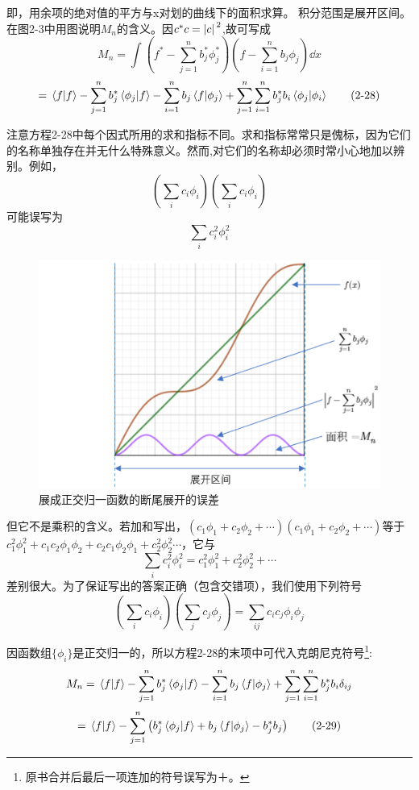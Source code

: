 即，用余项的绝对值的平方与x对划的曲线下的面积求算。
积分范围是展开区间。在图2-3中用图说明$M_n$的含义。因$c^*c=\abs*{c}^2$,故可写成
\[M_n=\int \left ( f^*-\sum_{j=1}^nb_j^*\phi_j^* \right ) \left ( f-\sum_{i=1}^nb_j\phi_j \right )\dd{x}\]
\[=\bra*{f}\ket*{f}-\sum_{j=1}^nb^*_j\bra*{\phi_j}\ket*{f}-\sum_{i=1}^nb_j\bra*{f}\ket*{\phi_j}+\sum_{j=1}^n\sum_{i=1}^nb_j^*b_i\bra*{\phi_j}\ket*{\phi_i} \tag{2-28}\]

注意方程2-28中每个因式所用的求和指标不同。求和指标常常只是傀标，因为它们的名称单独存在并无什么特殊意义。然而,对它们的名称却必须时常小心地加以辨别。例如，
\[\left (\sum_ic_i\phi_i\right )\left (\sum_ic_i\phi_i\right )\]
可能误写为
\[\sum_ic_i^2\phi_i^2\]
\begin{figure}[htbp]
    \centering
    \includegraphics[scale=0.6]{./fig/2-3.png}
    \caption{展成正交归一函数的断尾展开的误差}
\end{figure}
但它不是乘积的含义。若加和写出，$(c_1\phi_1+c_2\phi_2+ \cdots )(c_1\phi_1+c_2\phi_2+ \cdots )$等于$c_1^2\phi_1^2+c_1c_2\phi_1\phi_2+c_2c_1\phi_2\phi_1+c_2^2\phi_2^2 \cdots $，它与
\[\sum_ic_i^2\phi_i^2=c_1^2\phi_1^2+c_2^2\phi_2^2+ \cdots\]
差别很大。为了保证写出的答案正确（包含交错项），我们使用下列符号
\[\left (\sum_ic_i\phi_i\right )\left (\sum_jc_j\phi_j\right )=\sum_{ij}c_ic_j\phi_i\phi_j\]

因函数组$\{\phi_i\}$是正交归一的，所以方程2-28的末项中可代入克朗尼克符号\footnote{原书合并后最后一项连加的符号误写为＋。}:
\[M_n=\bra*{f}\ket*{f}-\sum_{j=1}^nb^*_j\bra*{\phi_j}\ket*{f}-\sum_{i=1}^nb_j\bra*{f}\ket*{\phi_j}+\sum_{j=1}^n\sum_{i=1}^nb_j^*b_i\delta_{ij}\]
\[=\bra*{f}\ket*{f}-\sum_{j=1}^n \left ( b^*_j\bra*{\phi_j}\ket*{f}+b_j\bra*{f}\ket*{\phi_j}-b_j^*b_j \right ) \tag{2-29}\]

